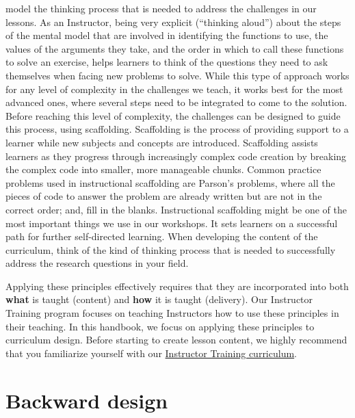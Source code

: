 \documentclass[]{book}
\begin{document}
\begin{enumerate}
  model the thinking process that is needed to address the challenges
  in our lessons. As an Instructor, being very explicit (``thinking
  aloud'') about the steps of the mental model that are involved in identifying
  the functions to use, the values of the arguments they take, and the order in
  which to call these functions to solve an exercise, helps learners to think
  of the questions they need to ask themselves when facing new problems to
  solve. While this type of approach works for any level of complexity in the
  challenges we teach, it works best for the most advanced ones, where several steps
  need to be integrated to come to the solution. Before reaching this level of
  complexity, the challenges can be designed to guide this process, using
  scaffolding. Scaffolding is the process of providing support to a learner while
  new subjects and concepts are introduced. Scaffolding assists learners as they
  progress through increasingly complex code creation by breaking the complex code
  into smaller, more manageable chunks. Common practice problems used in instructional
  scaffolding are Parson's problems, where all the pieces of code to answer the problem
  are already written but are not in the correct order; and, fill in the blanks.
  Instructional scaffolding might be one of the most important
  things we use in our workshops. It sets learners on a successful path
  for further self-directed learning. When developing the content of the curriculum, think of the
  kind of thinking process that is needed to successfully address the research
  questions in your field.
\end{enumerate}

Applying these principles effectively requires that they are incorporated into both
\textbf{what} is taught (content) and \textbf{how} it is taught (delivery). Our
Instructor Training program focuses on teaching Instructors how to use these principles
in their teaching. In this handbook, we focus on applying these principles to
curriculum design. Before starting to create lesson content, we highly recommend that you familiarize yourself with our \href{https://carpentries.github.io/instructor-training/}{Instructor Training curriculum}.

\hypertarget{backward-design}{%
\section{Backward design}\label{backward-design}}
\end{document}
